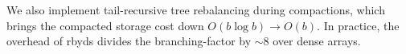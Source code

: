 \documentclass[letterpaper,twocolumn,10pt]{article}
\begin{document}
We also implement tail-recursive tree rebalancing during compactions,
which brings the compacted storage cost down
$O(b \log b) \rightarrow O(b)$.
In practice, the overhead of rbyds divides the branching-factor by
{$\sim$}8
over dense arrays.



%
%
%
%

% 
% 
% 
% 
% 
% 
% 
% 
% 
% 



\end{document}

